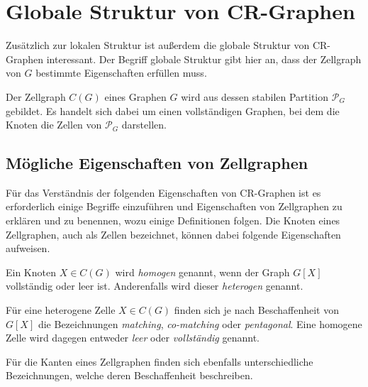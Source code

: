\section{Globale Struktur von CR-Graphen}
\label{sec/struktur_global}


Zusätzlich zur lokalen Struktur ist außerdem die globale Struktur von CR-Graphen interessant.
Der Begriff globale Struktur gibt hier an, dass der Zellgraph von $G$ bestimmte Eigenschaften erfüllen muss.

\begin{Definition}
	Der Zellgraph $C(G)$ eines Graphen $G$ wird aus dessen stabilen Partition $\mathcal{P}_G$ gebildet.
	Es handelt sich dabei um einen vollständigen Graphen, bei dem die Knoten die Zellen von $\mathcal{P}_G$ darstellen.
\end{Definition}

\subsection{Mögliche Eigenschaften von Zellgraphen}
Für das Verständnis der folgenden Eigenschaften von CR-Graphen ist es erforderlich einige Begriffe einzuführen und Eigenschaften von Zellgraphen zu erklären und zu benennen, wozu einige Definitionen folgen.
Die Knoten eines Zellgraphen, auch als Zellen bezeichnet, können dabei folgende Eigenschaften aufweisen.

\begin{Definition}
	Ein Knoten $X\in C(G)$ wird \emph{homogen} genannt, wenn der Graph $G[X]$ vollständig oder leer ist. Anderenfalls wird dieser \emph{heterogen} genannt.
\end{Definition}

\begin{Definition}
	Für eine heterogene Zelle $X\in C(G)$ finden sich je nach Beschaffenheit von $G[X]$ die Bezeichnungen \emph{matching}, \emph{co-matching} oder \emph{pentagonal}.
	Eine homogene Zelle wird dagegen entweder \emph{leer} oder \emph{vollständig} genannt.
\end{Definition}

Für die Kanten eines Zellgraphen finden sich ebenfalls unterschiedliche Bezeichnungen, welche deren Beschaffenheit beschreiben.

